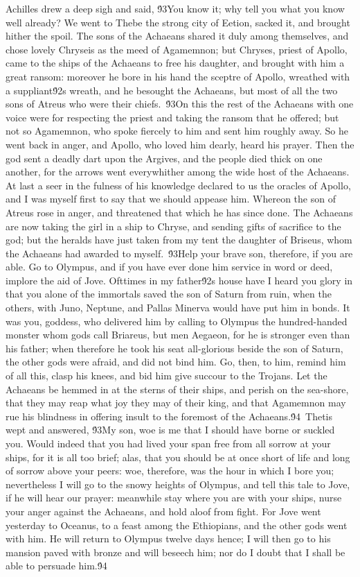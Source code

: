 {Achilles drew a deep sigh and said, \'93You know it; why tell you what you know well already? We went to Thebe the strong city of Eetion, sacked it, and brought hither the spoil. The sons of the Achaeans shared it duly among themselves, and chose lovely Chryseis as the meed of Agamemnon; but Chryses, priest of Apollo, came to the ships of the Achaeans to free his daughter, and brought with him a great ransom: moreover he bore in his hand the sceptre of Apollo, wreathed with a suppliant\'92s wreath, and he besought the Achaeans, but most of all the two sons of Atreus who were their chiefs.\
\'93On this the rest of the Achaeans with one voice were for respecting the priest and taking the ransom that he offered; but not so Agamemnon, who spoke fiercely to him and sent him roughly away. So he went back in anger, and Apollo, who loved him dearly, heard his prayer. Then the god sent a deadly dart upon the Argives, and the people died thick on one another, for the arrows went everywhither among the wide host of the Achaeans. At last a seer in the fulness of his knowledge declared to us the oracles of Apollo, and I was myself first to say that we should appease him. Whereon the son of Atreus rose in anger, and threatened that which he has since done. The Achaeans are now taking the girl in a ship to Chryse, and sending gifts of sacrifice to the god; but the heralds have just taken from my tent the daughter of Briseus, whom the Achaeans had awarded to myself.\
\'93Help your brave son, therefore, if you are able. Go to Olympus, and if you have ever done him service in word or deed, implore the aid of Jove. Ofttimes in my father\'92s house have I heard you glory in that you alone of the immortals saved the son of Saturn from ruin, when the others, with Juno, Neptune, and Pallas Minerva would have put him in bonds. It was you, goddess, who delivered him by calling to Olympus the hundred-handed monster whom gods call Briareus, but men Aegaeon, for he is stronger even than his father; when therefore he took his seat all-glorious beside the son of Saturn, the other gods were afraid, and did not bind him. Go, then, to him, remind him of all this, clasp his knees, and bid him give succour to the Trojans. Let the Achaeans be hemmed in at the sterns of their ships, and perish on the sea-shore, that they may reap what joy they may of their king, and that Agamemnon may rue his blindness in offering insult to the foremost of the Achaeans.\'94\
Thetis wept and answered, \'93My son, woe is me that I should have borne or suckled you. Would indeed that you had lived your span free from all sorrow at your ships, for it is all too brief; alas, that you should be at once short of life and long of sorrow above your peers: woe, therefore, was the hour in which I bore you; nevertheless I will go to the snowy heights of Olympus, and tell this tale to Jove, if he will hear our prayer: meanwhile stay where you are with your ships, nurse your anger against the Achaeans, and hold aloof from fight. For Jove went yesterday to Oceanus, to a feast among the Ethiopians, and the other gods went with him. He will return to Olympus twelve days hence; I will then go to his mansion paved with bronze and will beseech him; nor do I doubt that I shall be able to persuade him.\'94\
}
